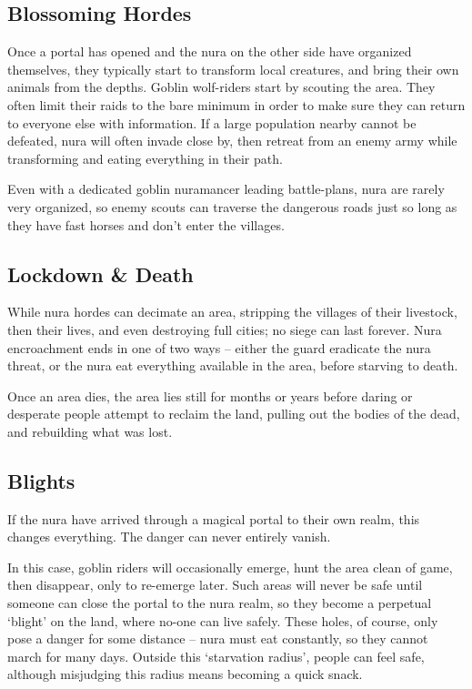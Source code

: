 \begin{multicols}{2}
\subsection{Blossoming Hordes}

Once a portal has opened and the nura on the other side have organized themselves, they typically start to transform local creatures, and bring their own animals from the depths.
Goblin wolf-riders start by scouting the area.
They often limit their raids to the bare minimum in order to make sure they can return to everyone else with information.
If a large population nearby cannot be defeated, nura will often invade close by, then retreat from an enemy army while transforming and eating everything in their path.

Even with a dedicated goblin nuramancer leading battle-plans, nura are rarely very organized, so enemy scouts can traverse the dangerous roads just so long as they have fast horses and don't enter the villages.

\subsection{Lockdown \& Death}

While nura hordes can decimate an area, stripping the villages of their livestock, then their lives, and even destroying full cities; no siege can last forever. 
Nura encroachment ends in one of two ways -- either the \gls{guard} eradicate the nura threat, or the nura eat everything available in the area, before starving to death.

Once an area dies, the area lies still for months or years before daring or desperate people attempt to reclaim the land, pulling out the bodies of the dead, and rebuilding what was lost.

\subsection{Blights}
\label{blight}

If the nura have arrived through a magical portal to their own realm, this changes everything.
The danger can never entirely vanish.

In this case, goblin riders will occasionally emerge, hunt the area clean of game, then disappear, only to re-emerge later.
Such areas will never be safe until someone can close the portal to the nura realm, so they become a perpetual `blight' on the land, where no-one can live safely.
These holes, of course, only pose a danger for some distance -- nura must eat constantly, so they cannot march for many days.
Outside this `starvation radius', people can feel safe, although misjudging this radius means becoming a quick snack.


\end{multicols}
